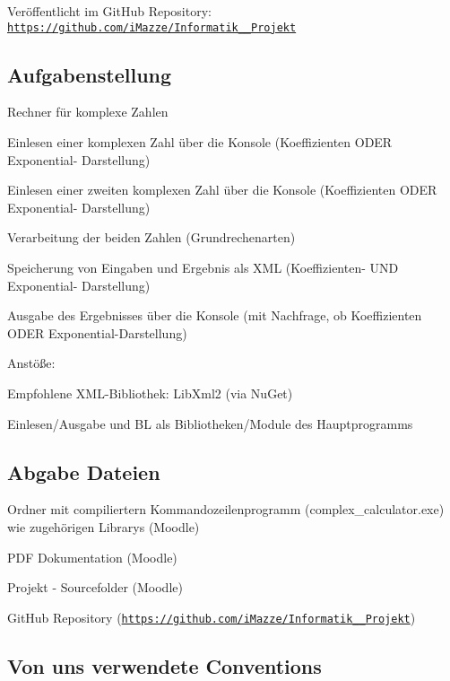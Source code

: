 Veröffentlicht im Git\+Hub Repository\+: \href{https://github.com/iMazze/Informatik_4_Projekt}{\tt https\+://github.\+com/i\+Mazze/\+Informatik\+\_\+\_\+\+Projekt} \subsection*{Aufgabenstellung}

Rechner für komplexe Zahlen
\begin{DoxyItemize}
\item Einlesen einer komplexen Zahl über die Konsole (Koeffizienten O\+D\+ER Exponential-\/ Darstellung)
\item Einlesen einer zweiten komplexen Zahl über die Konsole (Koeffizienten O\+D\+ER Exponential-\/ Darstellung)
\item Verarbeitung der beiden Zahlen (Grundrechenarten)
\item Speicherung von Eingaben und Ergebnis als X\+ML (Koeffizienten-\/ U\+ND Exponential-\/ Darstellung)
\item Ausgabe des Ergebnisses über die Konsole (mit Nachfrage, ob Koeffizienten O\+D\+ER Exponential-\/\+Darstellung)
\end{DoxyItemize}

Anstöße\+:
\begin{DoxyItemize}
\item Empfohlene X\+M\+L-\/\+Bibliothek\+: Lib\+Xml2 (via Nu\+Get)
\item Einlesen/\+Ausgabe und BL als Bibliotheken/\+Module des Hauptprogramms
\end{DoxyItemize}

\subsection*{Abgabe Dateien}


\begin{DoxyItemize}
\item Ordner mit compiliertern Kommandozeilenprogramm (complex\+\_\+calculator.\+exe) wie zugehörigen Librarys (Moodle)
\item P\+DF Dokumentation (Moodle)
\item Projekt -\/ Sourcefolder (Moodle)
\item Git\+Hub Repository (\href{https://github.com/iMazze/Informatik_4_Projekt}{\tt https\+://github.\+com/i\+Mazze/\+Informatik\+\_\+\_\+\+Projekt})
\end{DoxyItemize}

\subsection*{Von uns verwendete Conventions}

